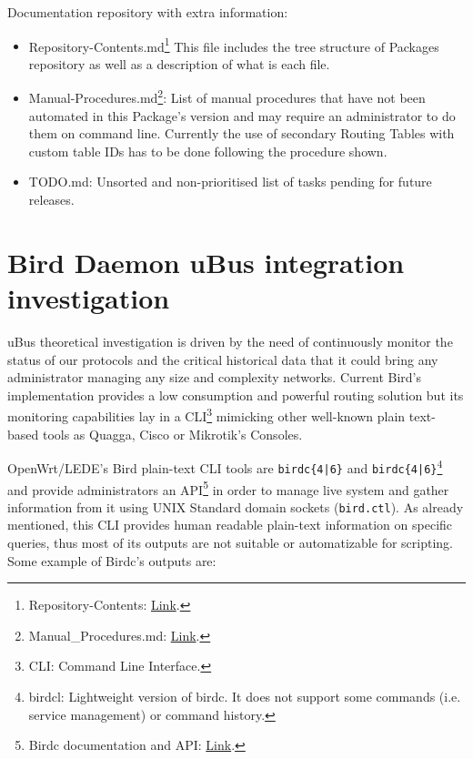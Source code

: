 Documentation repository with extra information:
\begin{itemize}
    \item Repository-Contents.md\footnote{Repository-Contents: \href{https://github.com/eloicaso/bgp-bmx6-bird-docn/blob/master/EN/Repository-Contents.md}{Link}.} This file includes the tree structure of Packages repository as well as a description of what is each file.
    \item Manual-Procedures.md\footnote{Manual\_Procedures.md: \href{https://github.com/eloicaso/bgp-bmx6-bird-docn/blob/master/EN/manual_procedures.md}{Link}.}: List of manual procedures that have not been automated in this Package's version and may require an administrator to do them on command line.
    Currently the use of secondary Routing Tables with custom table IDs has to be done following the procedure shown.
    \item TODO.md: Unsorted and non-prioritised list of tasks pending for future releases.
\end{itemize}

\section{Bird Daemon uBus integration investigation}
uBus theoretical investigation is driven by the need of continuously monitor the status of our protocols and the critical historical data that it could bring any administrator managing any size and complexity networks. Current Bird's implementation provides a low consumption and powerful routing solution but its monitoring capabilities lay in a CLI\footnote{CLI: Command Line Interface.} mimicking other well-known plain text-based tools as Quagga, Cisco or Mikrotik's Consoles.

OpenWrt/LEDE's Bird plain-text CLI tools are \texttt{birdc\{4|6\}} and \texttt{birdc\{4|6\}}\footnote{birdcl: Lightweight version of birdc. It does not support some commands (i.e. service management) or command history.} and provide administrators an API\footnote{Birdc documentation and API: \href{http://bird.network.cz/?get_doc&f=bird-4.html}{Link}.} in order to manage live system and gather information from it using UNIX Standard domain sockets (\texttt{bird.ctl}). As already mentioned, this CLI provides human readable plain-text information on specific queries, thus most of its outputs are not suitable or automatizable for scripting. Some example of Birdc's outputs are:



